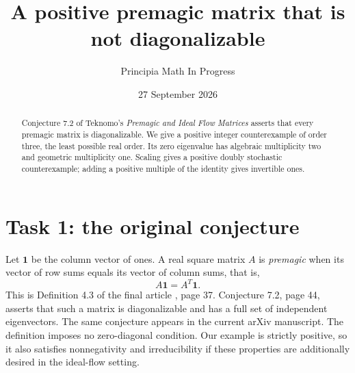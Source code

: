 \documentclass[11pt]{article}
\title{A positive premagic matrix that is not diagonalizable}
\author{Principia Math In Progress}
\date{27 September 2026}
\begin{document}
\maketitle
\begin{abstract}
Conjecture 7.2 of Teknomo's \emph{Premagic and Ideal Flow Matrices}
asserts that every premagic matrix is diagonalizable. We give a positive
integer counterexample of order three, the least possible real order.
Its zero eigenvalue has algebraic multiplicity two and geometric
multiplicity one. Scaling gives a positive doubly stochastic counterexample;
adding a positive multiple of the identity gives invertible ones.
\end{abstract}

\section*{Task 1: the original conjecture}
Let $\mathbf 1$ be the column vector of ones. A real square matrix $A$
is \emph{premagic} when its vector of row sums equals its vector of
column sums, that is,
\[
 A\mathbf 1=A^T\mathbf 1.
\]
This is Definition 4.3 of the final article \cite{Teknomo}, page 37.
Conjecture 7.2, page 44, asserts that such a matrix is diagonalizable
and has a full set of independent eigenvectors. The same conjecture
appears in the current arXiv manuscript. The definition imposes no
zero-diagonal condition. Our example is strictly positive, so it also
satisfies nonnegativity and irreducibility if these properties are
additionally desired in the ideal-flow setting.
\end{document}

